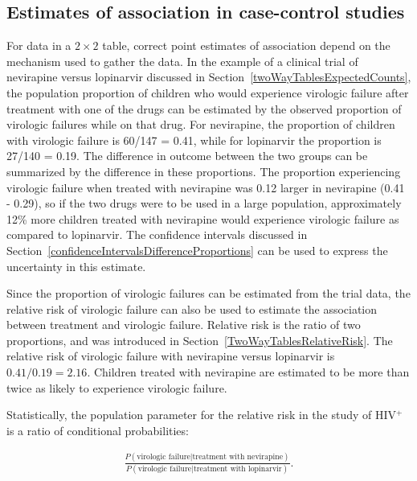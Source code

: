 \subsection{Estimates of association in case-control studies}
\label{caseControlStudiesEstimates}


For data in a $2 \times 2$ table, correct point estimates of association depend on the mechanism used to gather the data.  In the example of a clinical trial of nevirapine versus lopinarvir discussed in Section~\ref{twoWayTablesExpectedCounts}, the population proportion of children who would experience virologic failure after treatment with one of the drugs can be estimated by the observed proportion of virologic failures while on that drug. For nevirapine, the proportion of children with virologic failure is 60/147 = 0.41, while for lopinarvir the proportion is 27/140 = 0.19.  The difference in outcome between the two groups can be summarized by the difference in these proportions. The proportion experiencing virologic failure when treated with nevirapine was 0.12 larger in nevirapine (0.41 - 0.29), so if the two drugs were to be used in a large population, approximately 12\% more children treated with nevirapine would experience virologic failure as compared to lopinarvir. The confidence intervals discussed in Section~\ref{confidenceIntervalsDifferenceProportions} can be used to express the uncertainty in this estimate.

Since the proportion of virologic failures can be estimated from the trial data, the relative risk of virologic failure can also be used to estimate the association between treatment and virologic failure. Relative risk is the ratio of two proportions, and was introduced in Section~\ref{TwoWayTablesRelativeRisk}.  The relative risk of virologic failure with nevirapine versus lopinarvir is $0.41/0.19 = 2.16$.  Children treated with nevirapine are estimated to be more than twice as likely to experience virologic failure.  

Statistically, the population parameter for the relative risk in the study of HIV$^+$ is a ratio of conditional probabilities:

\begin{align*}
  \frac{P(\text{virologic failure}| \text{treatment with nevirapine})}
  {P(\text{virologic failure}|\text{treatment with lopinarvir})}.
\end{align*}

